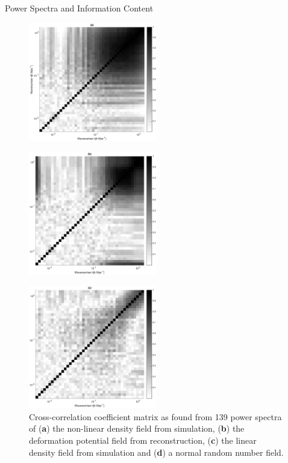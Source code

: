 \begin{section}{Power Spectra and Information Content}
\begin{figure}
 \centering
  \includegraphics[width=0.5\textwidth]{corrnb.eps}
\label{fig:corrnb}
\end{figure}
\begin{figure}
 \centering
  \includegraphics[width=0.5\textwidth]{corrrec.eps}
\label{fig:corrrec}
\end{figure}
\begin{figure}
  \includegraphics[width=0.5\textwidth]{corrlin.eps}
%
  \caption{Cross-correlation coefficient matrix as found from 139 power spectra of (\textbf{a}) the non-linear density field from simulation, (\textbf{b}) the deformation potential field from reconstruction, (\textbf{c}) the linear density field from simulation and (\textbf{d}) a normal random number field.}   


\end{figure}
\end{section}

